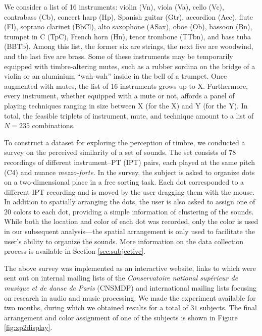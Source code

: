 \documentclass{bmcart}
\begin{document}
We consider a list of 16 instruments: violin (Vn), viola (Va), cello (Vc), contrabass (Cb), concert harp (Hp), Spanish guitar (Gtr), accordion (Acc), flute (Fl), soprano clarinet (BbCl), alto saxophone (ASax), oboe (Ob), bassoon (Bn), trumpet in C (TpC), French horn (Hn), tenor trombone (TTbn), and bass tuba (BBTb).
Among this list, the former six are strings, the next five are woodwind, and the last five are brass.
Some of these instruments may be temporarily equipped with timbre-altering mutes, such as a rubber sordina on the bridge of a violin or an aluminium ``wah-wah'' inside in the bell of a trumpet.
Once augmented with mutes, the list of 16 instruments grows up to X. %
Furthermore, every instrument, whether equipped with a mute or not, affords a panel of playing techniques ranging in size between X (for the X) and Y (for the Y). %
In total, the feasible triplets of instrument, mute, and technique amount to a list of $N=235$ combinations.




To construct a dataset for exploring the perception of timbre, we conducted a survey on the perceived similarity of a set of sounds.
The set consists of $78$ recordings of different instrument--PT (IPT) pairs, each played at the same pitch (C4) and nuance \textit{mezzo-forte}. %
In the survey, the subject is asked to organize dots on a two-dimensional place in a free sorting task.
Each dot corresponded to a different IPT recording and is moved by the user dragging them with the mouse.
In addition to spatially arranging the dots, the user is also asked to assign one of $20$ colors to each dot, providing a simple information of clustering of the sounds.
While both the location and color of each dot was recorded, only the color is used in our subsequent analysis---the spatial arrangement is only used to facilitate the user's ability to organize the sounds.
More information on the data collection process is available in  Section \ref{sec:subjective}.

The above survey was implemented as an interactive website, links to which were sent out on internal mailing lists of the \emph{Conservatoire national sup\'erieur de musique et de danse de Paris} (CNSMDP) and international mailing lists focusing on research in audio and music processing.
We made the experiment available for two months, during which we obtained results for a total of $31$ subjects.
The final arrangement and color assignment of one of the subjects is shown in Figure \ref{fig:xp2display}.
\end{document}
